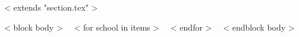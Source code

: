 ~< extends "section.tex" >~

~< block body >~
~< for school in items >~
~< endfor >~
~< endblock body >~
